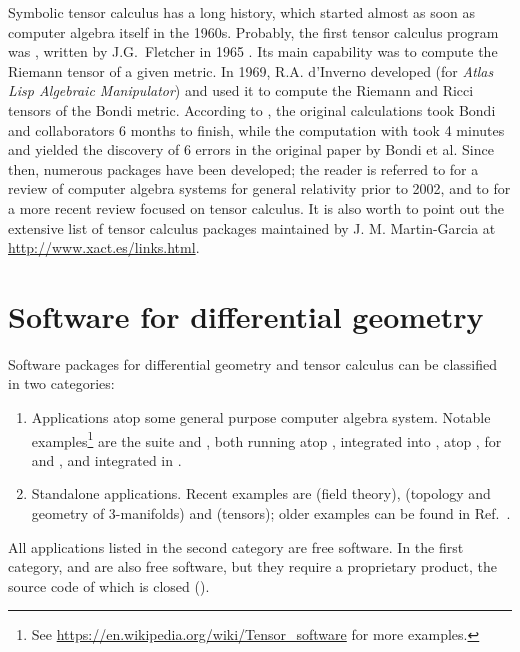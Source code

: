 Symbolic tensor calculus has a long history, which started
almost as soon as computer algebra itself in the 1960s.
Probably, the first tensor calculus program was , written by J.G.~Fletcher
in 1965 \cite{Fletc67}. Its main capability was to compute the Riemann tensor
of a given metric. In 1969, R.A. d'Inverno developed 
(for \emph{Atlas Lisp Algebraic Manipulator}) and used it to compute
the Riemann and Ricci tensors of the Bondi metric.
According to \cite{Skea94},
the original calculations took Bondi and collaborators 6 months to finish,
while the computation with  took 4 minutes and yielded the
discovery of 6 errors in the original paper by Bondi et al.
Since then, numerous packages have been developed; the reader is referred to \cite{MacCa02}
for a review of computer algebra
systems for general relativity prior to 2002, and to \cite{KorolKS13} for a more recent review
focused on tensor calculus.
It is also worth to point out the extensive list of
tensor calculus packages maintained by J. M. Martin-Garcia at
\url{http://www.xact.es/links.html}.


\section{Software for differential geometry}

Software packages for differential geometry and tensor calculus can be
classified in two categories:
\begin{enumerate}
\item Applications atop some general purpose computer algebra system.
Notable examples\footnote{See \url{https://en.wikipedia.org/wiki/Tensor_software}
for more examples.} are
the  suite \cite{Marti08} and  \cite{ricci}, both
running atop ,
 \cite{AnderT12} integrated into ,
 \cite{grtensorIII} atop ,  \cite{atlas2}
for  and , and
 \cite{sagemanifolds} integrated in .
\item Standalone applications. Recent examples are 
\cite{Peete07} (field theory),
 \cite{snappy} (topology and geometry of 3-manifolds)  and
 \cite{BolotP13} (tensors); older examples can be found in
Ref.~\cite{MacCa02}.
\end{enumerate}
All applications listed in the second category are free software. In
the first category,  and  are also free software, but
they require a proprietary product, the source code of which is closed ().

